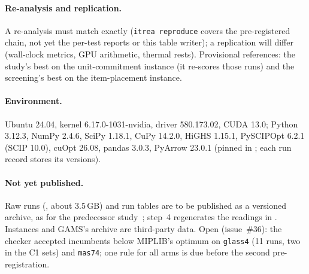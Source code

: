 \paragraph{Re-analysis and replication.} A re-analysis must match exactly (\texttt{itrea reproduce} covers the
pre-registered chain, not yet the per-test reports or this table writer); a replication will differ (wall-clock
metrics, GPU arithmetic, thermal rests). Provisional references: the study's best on the unit-commitment instance (it
re-scores those runs) and the screening's best on the item-placement instance.

\paragraph{Environment.} Ubuntu 24.04, kernel 6.17.0-1031-nvidia, driver 580.173.02, CUDA 13.0; Python 3.12.3,
NumPy 2.4.6, SciPy 1.18.1, CuPy 14.2.0, HiGHS 1.15.1, PySCIPOpt 6.2.1 (SCIP 10.0), cuOpt 26.08, pandas 3.0.3, PyArrow
23.0.1 (pinned in ; each run record stores its versions).

\paragraph{Not yet published.} Raw runs (, about
3.5\,GB) and run tables are to be published as a versioned archive, as for the predecessor
study~\citep{orbay2026optopt}; step~4 regenerates the readings in . Instances and GAMS's archive are
third-party data. Open (issue~\#36): the checker accepted incumbents below MIPLIB's optimum on \texttt{glass4} (11
runs, two in the C1 sets) and \texttt{mas74}; one rule for all arms is due before the second pre-registration.
